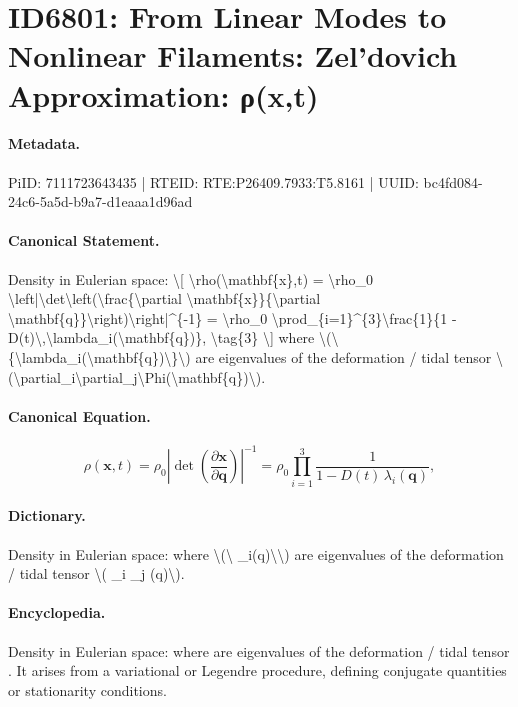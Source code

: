\section*{ID6801: From Linear Modes to Nonlinear Filaments: Zel’dovich Approximation: ρ(x,t)}
\paragraph{Metadata.}
PiID: 7111723643435 | RTEID: RTE:P26409.7933:T5.8161 | UUID: bc4fd084-24c6-5a5d-b9a7-d1eaaa1d96ad

\paragraph{Canonical Statement.}
Density in Eulerian space: \textbackslash{}[ \textbackslash{}rho(\textbackslash{}mathbf\{x\},t) = \textbackslash{}rho\_0 \textbackslash{}left|\textbackslash{}det\textbackslash{}left(\textbackslash{}frac\{\textbackslash{}partial \textbackslash{}mathbf\{x\}\}\{\textbackslash{}partial \textbackslash{}mathbf\{q\}\}\textbackslash{}right)\textbackslash{}right|\textasciicircum{}\{-1\} = \textbackslash{}rho\_0 \textbackslash{}prod\_\{i=1\}\textasciicircum{}\{3\}\textbackslash{}frac\{1\}\{1 - D(t)\textbackslash{},\textbackslash{}lambda\_i(\textbackslash{}mathbf\{q\})\}, \textbackslash{}tag\{3\} \textbackslash{}] where \textbackslash{}(\textbackslash{}\{\textbackslash{}lambda\_i(\textbackslash{}mathbf\{q\})\textbackslash{}\}\textbackslash{}) are eigenvalues of the deformation / tidal tensor \textbackslash{}(\textbackslash{}partial\_i\textbackslash{}partial\_j\textbackslash{}Phi(\textbackslash{}mathbf\{q\})\textbackslash{}).

\paragraph{Canonical Equation.}
\[
\rho(\mathbf{x},t) = \rho_0 \left|\det\left(\frac{\partial \mathbf{x}}{\partial \mathbf{q}}\right)\right|^{-1} = \rho_0 \prod_{i=1}^{3}\frac{1}{1 - D(t)\,\lambda_i(\mathbf{q})}, \tag{3}
\]

\paragraph{Dictionary.}
Density in Eulerian space: where \textbackslash{}(\textbackslash{} \_i(q)\textbackslash{}\textbackslash{}) are eigenvalues of the deformation / tidal tensor \textbackslash{}( \_i \_j (q)\textbackslash{}).

\paragraph{Encyclopedia.}
Density in Eulerian space: where are eigenvalues of the deformation / tidal tensor . It arises from a variational or Legendre procedure, defining conjugate quantities or stationarity conditions.
